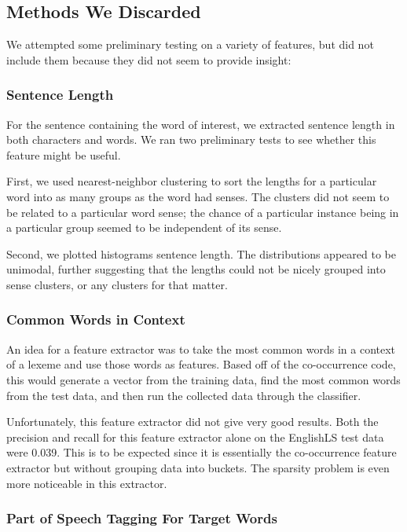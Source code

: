 \documentclass{article}
\begin{document}
\subsection{Methods We Discarded}

We attempted some preliminary testing on a variety of features, but did not include them because they did not seem to provide insight:

\subsubsection{Sentence Length} For the sentence containing the word of
interest, we extracted sentence length in both characters and words. We ran two
preliminary tests to see whether this feature might be useful.

First, we used nearest-neighbor clustering to sort the lengths for a particular
word into as many groups as the word had senses. The clusters did not seem to be
related to a particular word sense; the chance of a particular instance being in
a particular group seemed to be independent of its sense.

Second, we plotted histograms sentence length. The distributions appeared to be
unimodal, further suggesting that the lengths could not be nicely grouped into
sense clusters, or any clusters for that matter.

\subsubsection{Common Words in Context}

An idea for a feature extractor was to take the most common words in a context
of a lexeme and use those words as features. Based off of the co-occurrence code,
this would generate a vector from the training data, find the most common words
from the test data, and then run the collected data through the classifier.

Unfortunately, this feature extractor did not give very good results. Both the
precision and recall for this feature extractor alone on the EnglishLS test data
were 0.039. This is to be expected since it is essentially the co-occurrence
feature extractor but without grouping data into buckets. The sparsity problem
is even more noticeable in this extractor.

\subsubsection{Part of Speech Tagging For Target Words}
\end{document}
